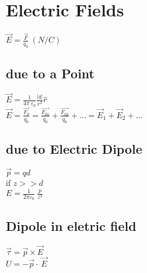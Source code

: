 \section*{Electric Fields}
$\vec{E}=\frac{\vec{F}}{q_0}\:\left(N/C \right)$\\
\subsection*{due to a Point}
$\vec{E}=\frac{1}{4\pi \:\varepsilon_0}\frac{\left|q\right|}{r^2}\widehat{r}$\\
$\vec{E}=\frac{\vec{F_0}}{q_0}=\frac{\vec{F_{01}}}{q_0}+\frac{\vec{F_{02}}}{q_0}+\dots =\vec{E}_1+\vec{E}_2+\dots $\\
\subsection*{due to Electric Dipole}
$\vec{p}=qd$\\
if $z>>d$\\
$E=\frac{1}{2\pi \varepsilon_0}\:\frac{p}{z^3}$\\
\subsection*{Dipole in eletric field}
$\vec{\tau }=\vec{p}\times \vec{E}$\\
$U=-\vec{p}\cdot \:\vec{E}$\\